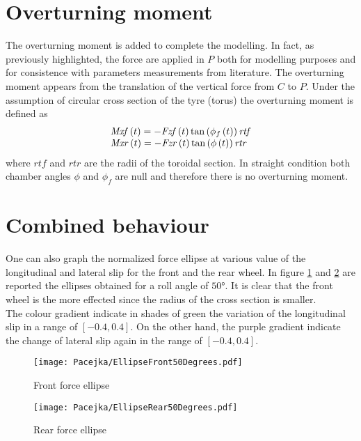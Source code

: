 \section{Overturning moment}
%
The overturning moment is added to complete the modelling. In fact, as previously highlighted, the force are applied in $P$ both for modelling purposes and for consistence with parameters measurements from literature\cite{pacejka2012tire,sharp2014method}. The overturning moment appears from the translation of the vertical force from $C$ to $P$. Under the assumption of circular cross section of the tyre (torus) the overturning moment is defined as
%
\begin{equation}
    \begin{array}{l} {\it Mxf} \left( t \right) =-{\it Fzf}
    \left( t \right) \tan \left( \phi_{f} \left( t \right)  \right) {\it 
   rtf}\\ {\it Mxr} \left( t \right) =-{\it Fzr}
    \left( t \right) \tan \left( \phi \left( t \right)  \right) {\it rtr}
   \end{array}  
\end{equation}
%
where $rtf$ and $rtr$ are the radii of the toroidal section. In straight condition both chamber angles $\phi$ and $\phi_f$ are null and therefore there is no overturning moment. 
%
%
\section{Combined behaviour}
%
One can also graph the normalized force ellipse at various value of the longitudinal and lateral slip for the front and the rear wheel. In figure \ref{fig:EllFront} and \ref{fig:EllRear} are reported the ellipses obtained for a roll angle of $50\si{\degree}$. It is clear that the front wheel is the more effected since the radius of the cross section is smaller.\\
The colour gradient indicate in shades of green the variation of the longitudinal slip in a range of $[-0.4,0.4]$. On the other hand, the purple gradient indicate the change of lateral slip again in the range of $[-0.4,0.4]$.

%
\begin{figure}[hbt]
    \texttt{[image: Pacejka/EllipseFront50Degrees.pdf]}
    \caption{Front force ellipse}
    \label{fig:EllFront}
\end{figure}
%
%
\begin{figure}[hbt]
    \texttt{[image: Pacejka/EllipseRear50Degrees.pdf]}
    \caption{Rear force ellipse}
    \label{fig:EllRear}
\end{figure}
%
